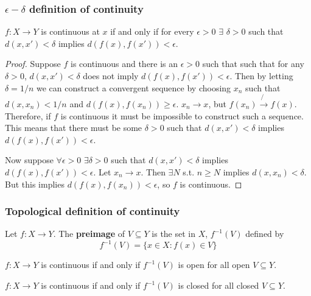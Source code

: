 \documentclass[compress]{beamer}
\renewcommand{\to}{{\rightarrow}}
\begin{document}
\begin{frame}[shrink]
  \frametitle{$\epsilon-\delta$ definition of continuity}
  \begin{lemma}\label{lem:ced}
    $f: X \to Y$ is continuous at $x$ if and only if for every
    $\epsilon>0$ $\exists$ $\delta >0$ such that $d(x,x') < \delta $
    implies $d(f(x),f(x')) < \epsilon$.
  \end{lemma}
  \begin{proof}
    Suppose $f$ is continuous and there is an $\epsilon>0$ such that
    such that for any $\delta>0$, $d(x,x') < \delta$ does not imply
    $d(f(x),f(x'))< \epsilon$. Then by letting $\delta = 1/n$ we can
    construct a convergent sequence by choosing $x_n$ such that
    $d(x,x_n) < 1/n$ and $d(f(x),f(x_n)) \geq \epsilon$. $x_n \to x$,
    but $f(x_n) \not\to f(x)$. Therefore, if $f$ is continuous it must
    be impossible to construct such a sequence. This means that there
    must be some $\delta>0$ such that $d(x,x') < \delta$ implies
    $d(f(x),f(x')) < \epsilon$.
    
    Now suppose $\forall \epsilon>0$ $\exists \delta>0$ such that
    $d(x,x')<\delta$ implies $d(f(x),f(x')) <\epsilon$. Let $x_n \to
    x$. Then $\exists N$ s.t. $n\geq N$ implies $d(x,x_n) < \delta$. But
    this implies $d(f(x),f(x_n)) < \epsilon$, so $f$ is continuous.
  \end{proof}
\end{frame}

\begin{frame}[shrink]
  \frametitle{Topological definition of continuity}
  \begin{definition}
    Let $f: X \to Y$. The \textbf{preimage} of $V \subseteq Y$ is the
    set in $X$, $f^{-1}(V)$ defined by
    \[ f^{-1} (V) = \{ x \in X: f(x) \in V \} \]
  \end{definition}
  
  \begin{lemma}\label{lem:copen}
    $f:X \to Y$ is continuous if and only if $f^{-1}(V)$ is open for all
    open $V \subseteq Y$. 
  \end{lemma}

  \begin{corollary}
    $f:X \to Y$ is continuous if and only if $f^{-1}(V)$ is closed for all
    closed $V \subseteq Y$. 
  \end{corollary}
\end{frame}
\end{document}
